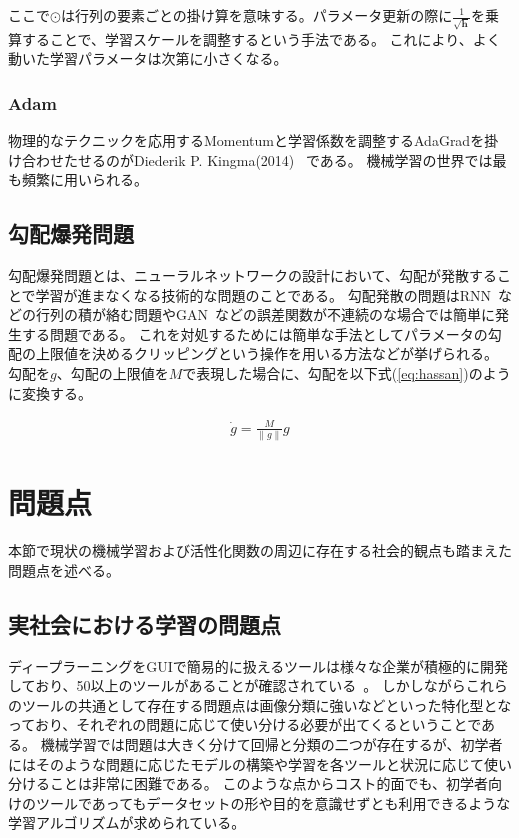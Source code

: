 ここで$ \odot $は行列の要素ごとの掛け算を意味する。パラメータ更新の際に$ \frac{ 1 }{\sqrt{\mathbf{h}}} $を乗算することで、学習スケールを調整するという手法である。
これにより、よく動いた学習パラメータは次第に小さくなる。



\subsubsection{Adam}
物理的なテクニックを応用するMomentumと学習係数を調整するAdaGradを掛け合わせたせるのがDiederik P. Kingma(2014)~\cite{adam} である。
機械学習の世界では最も頻繁に用いられる。



\subsection{勾配爆発問題}
勾配爆発問題とは、ニューラルネットワークの設計において、勾配が発散することで学習が進まなくなる技術的な問題のことである。
勾配発散の問題はRNN~\cite{rnn}などの行列の積が絡む問題やGAN~\cite{gan}などの誤差関数が不連続のな場合では簡単に発生する問題である。
これを対処するためには簡単な手法としてパラメータの勾配の上限値を決めるクリッピングという操作を用いる方法などが挙げられる。
勾配を$ g $、勾配の上限値を$ M $で表現した場合に、勾配を以下式(\ref{eq:hassan})のように変換する。


\begin{eqnarray}
\dot g = \frac{M}{\|g\|} g
\label{eq:hassan}
\end{eqnarray}


\section{問題点}

本節で現状の機械学習および活性化関数の周辺に存在する社会的観点も踏まえた問題点を述べる。

\subsection{実社会における学習の問題点}

ディープラーニングをGUIで簡易的に扱えるツールは様々な企業が積極的に開発しており、50以上のツールがあることが確認されている~\cite{gui}。
しかしながらこれらのツールの共通として存在する問題点は画像分類に強いなどといった特化型となっており、それぞれの問題に応じて使い分ける必要が出てくるということである。
機械学習では問題は大きく分けて回帰と分類の二つが存在するが、初学者にはそのような問題に応じたモデルの構築や学習を各ツールと状況に応じて使い分けることは非常に困難である。
このような点からコスト的面でも、初学者向けのツールであってもデータセットの形や目的を意識せずとも利用できるような学習アルゴリズムが求められている。


